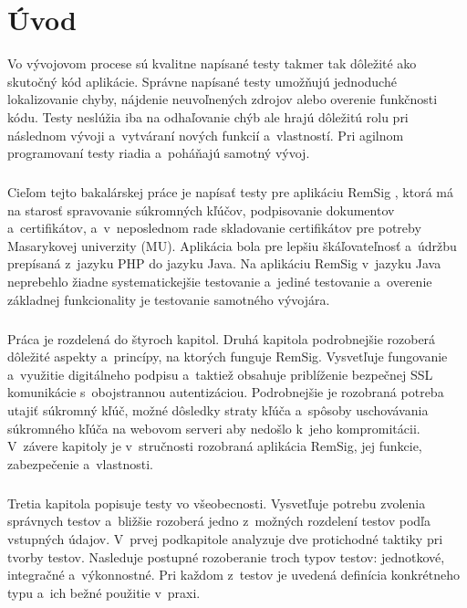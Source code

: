 \documentclass[
  digital, %
  table,   %
oneside,
  nolof,     %
  nolot,     %
]{fithesis3}
\begin{document}
\chapter{Úvod}
Vo vývojovom procese sú kvalitne napísané testy takmer tak dôležité ako skutočný kód aplikácie. Správne napísané testy umožňujú jednoduché lokalizovanie chyby, nájdenie neuvoľnených zdrojov alebo overenie funkčnosti kódu. Testy neslúžia iba na odhaľovanie chýb ale hrajú dôležitú rolu pri následnom vývoji a~vytváraní nových funkcií a~vlastností. Pri agilnom programovaní \cite{agileDef} testy riadia a~poháňajú samotný vývoj. \paragraph{}
Cieľom tejto bakalárskej práce je napísať testy pre aplikáciu RemSig \cite{remsigMuni}, ktorá má na starosť spravovanie súkromných kľúčov, podpisovanie dokumentov a~certifikátov, a~v~neposlednom rade skladovanie certifikátov pre potreby Masarykovej univerzity (MU). Aplikácia bola pre lepšiu škáľovateľnosť a~údržbu prepísaná z~jazyku PHP do jazyku Java. Na aplikáciu RemSig  v~jazyku Java neprebehlo žiadne systematickejšie testovanie a~jediné testovanie a~overenie základnej funkcionality je testovanie samotného vývojára.\paragraph{}
Práca je rozdelená do štyroch kapitol. Druhá kapitola podrobnejšie rozoberá dôležité aspekty a~princípy, na ktorých funguje RemSig. Vysvetľuje fungovanie a~využitie digitálneho podpisu a~taktiež obsahuje priblíženie bezpečnej SSL komunikácie s~obojstrannou autentizáciou. Podrobnejšie je rozobraná potreba utajiť súkromný kľúč, možné dôsledky straty kľúča a~spôsoby uschovávania súkromného kľúča na webovom serveri aby nedošlo k~jeho kompromitácii. V~závere kapitoly  je v~stručnosti rozobraná aplikácia RemSig, jej funkcie, zabezpečenie a~vlastnosti. \paragraph{}
Tretia kapitola popisuje testy vo všeobecnosti. Vysvetľuje potrebu zvolenia správnych testov a~bližšie rozoberá jedno z~možných rozdelení testov podľa vstupných údajov. V~prvej podkapitole analyzuje dve protichodné taktiky pri tvorby testov. Nasleduje postupné rozoberanie troch typov testov: jednotkové, integračné a~výkonnostné. Pri každom z~testov je uvedená definícia konkrétneho typu a~ich bežné použitie v~praxi.\paragraph{}
\end{document}
